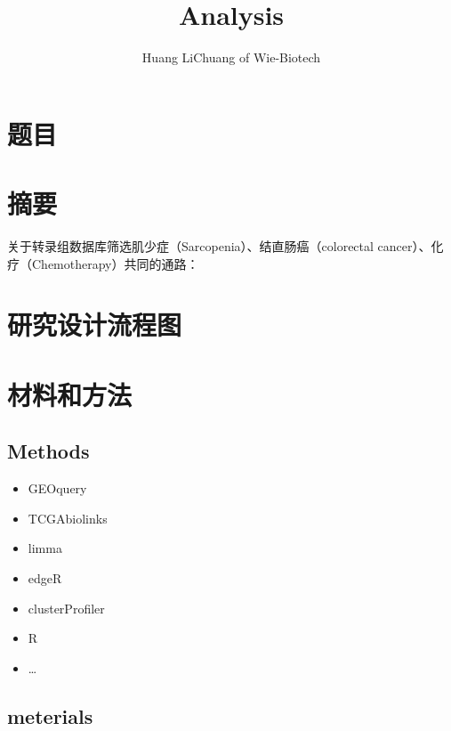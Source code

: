 \documentclass[
]{article}
\title{Analysis}
\author{Huang LiChuang of Wie-Biotech}
\date{}
\providecommand{\tightlist}{%
  \setlength{\itemsep}{0pt}\setlength{\parskip}{0pt}}
\begin{document}
\maketitle

{
\setcounter{tocdepth}{3}
\tableofcontents
}
\listoffigures

\listoftables

\hypertarget{ux9898ux76ee}{%
\section{题目}\label{ux9898ux76ee}}

\hypertarget{abstract}{%
\section{摘要}\label{abstract}}

关于转录组数据库筛选肌少症（Sarcopenia）、结直肠癌（colorectal cancer）、化疗（Chemotherapy）共同的通路：

\hypertarget{route}{%
\section{研究设计流程图}\label{route}}

\hypertarget{methods}{%
\section{材料和方法}\label{methods}}

\hypertarget{methods-1}{%
\subsection{Methods}\label{methods-1}}

\begin{itemize}
\tightlist
\item
  GEOquery
\item
  TCGAbiolinks
\item
  limma
\item
  edgeR
\item
  clusterProfiler
\item
  R
\item
  \ldots{}
\end{itemize}

\hypertarget{meterials}{%
\subsection{meterials}\label{meterials}}
\end{document}
